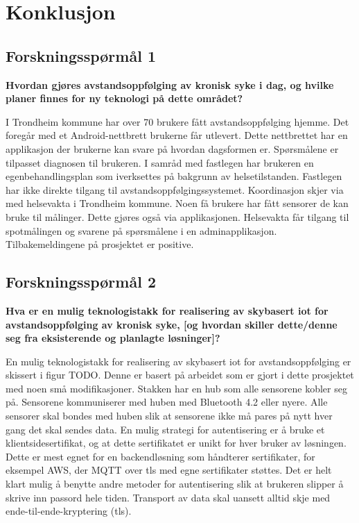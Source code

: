 \chapter{Konklusjon}
\label{ch:conclusion}

\section{Forskningsspørmål 1}
\textbf{Hvordan gjøres avstandsoppfølging av kronisk syke i dag, og hvilke planer finnes for ny teknologi på dette området?}

I Trondheim kommune har over 70 brukere fått avstandsoppfølging hjemme. Det
foregår med et Android-nettbrett brukerne får utlevert. Dette nettbrettet har en
applikasjon der brukerne kan svare på hvordan dagsformen er. Spørsmålene er
tilpasset diagnosen til brukeren. I samråd med fastlegen har brukeren en
egenbehandlingsplan som iverksettes på bakgrunn av helsetilstanden. Fastlegen
har ikke direkte tilgang til avstandsoppfølgingssystemet. Koordinasjon skjer via med
helsevakta i Trondheim kommune. Noen få brukere har fått sensorer de kan bruke
til målinger. Dette gjøres også via applikasjonen. Helsevakta får tilgang til
spotmålingen og svarene på spørsmålene i en adminapplikasjon. Tilbakemeldingene
på prosjektet er positive.


\section{Forskningsspørmål 2}
\textbf{Hva er en mulig teknologistakk for realisering av skybasert \gls{iot} for avstandsoppfølging av kronisk syke,
    [og hvordan skiller dette/denne seg fra eksisterende og planlagte løsninger]?}

En mulig teknologistakk for realisering av skybasert \gls{iot} for
avstandsoppfølging er skissert i figur TODO. Denne er basert på arbeidet som er
gjort i dette prosjektet med noen små modifikasjoner. Stakken har en hub som
alle sensorene kobler seg på. Sensorene kommuniserer med huben med Bluetooth 4.2
eller nyere. Alle sensorer skal bondes med huben slik at sensorene ikke må pares
på nytt hver gang det skal sendes data. En mulig strategi for autentisering er å
bruke et klientsidesertifikat, og at dette sertifikatet er unikt for hver bruker
av løsningen. Dette er mest egnet for en backendløsning som håndterer
sertifikater, for eksempel AWS, der MQTT over \gls{tls} med egne sertifikater
støttes. Det er helt klart mulig å benytte andre metoder for autentisering slik
at brukeren slipper å skrive inn passord hele tiden. Transport av data skal
uansett alltid skje med ende-til-ende-kryptering (\gls{tls}).

